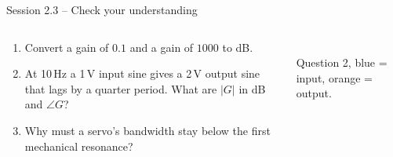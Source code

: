 \documentclass[aspectratio=169,10pt]{beamer}
\begin{document}
\begin{frame}{Session 2.3 -- Check your understanding}
\begin{columns}[T]
\begin{keybox}
\begin{enumerate}
  \item Convert a gain of $0.1$ and a gain of $1000$ to dB.
  \item At 10\,Hz a 1\,V input sine gives a 2\,V output sine that lags by a quarter period. What are $|G|$ in dB and $\angle G$?
  \item Why must a servo's bandwidth stay below the first mechanical resonance?
\end{enumerate}
\end{keybox}
\centering
{}\\
\footnotesize Question 2, blue = input, orange = output.
\end{columns}
\end{frame}
\end{document}
